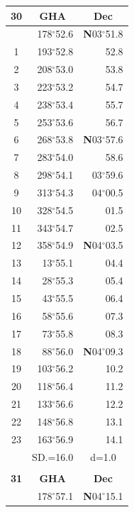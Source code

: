\documentclass[10pt, a4paper]{report}
\begin{document}
\begin{scriptsize}
\begin{tabular*}{0.2\textwidth}[t]{@{\extracolsep{\fill}}|c|rr|}
\hline
\multicolumn{1}{|c|}{\rule{0pt}{2.6ex}\textbf{30}} & \multicolumn{1}{c}{\textbf{GHA}} & \multicolumn{1}{c|}{\textbf{Dec}}\\
\hline\rule{0pt}{2.6ex}\noindent
0 & 178$^\circ$52.6 & \textbf{N}03$^\circ$51.8\\
1 & 193$^\circ$52.8 & 52.8\\
2 & 208$^\circ$53.0 & 53.8\\
3 & 223$^\circ$53.2 & \raisebox{0.24ex}{\boldmath$\cdot$~\boldmath$\cdot$~~}54.7\\
4 & 238$^\circ$53.4 & 55.7\\
5 & 253$^\circ$53.6 & 56.7\\[2Pt]
6 & 268$^\circ$53.8 & \textbf{N}03$^\circ$57.6\\
7 & 283$^\circ$54.0 & 58.6\\
8 & 298$^\circ$54.1 & 03$^\circ$59.6\\
9 & 313$^\circ$54.3 & 04$^\circ$00.5\\
10 & 328$^\circ$54.5 & 01.5\\
11 & 343$^\circ$54.7 & 02.5\\[2Pt]
12 & 358$^\circ$54.9 & \textbf{N}04$^\circ$03.5\\
13 & 13$^\circ$55.1 & 04.4\\
14 & 28$^\circ$55.3 & 05.4\\
15 & 43$^\circ$55.5 & \raisebox{0.24ex}{\boldmath$\cdot$~\boldmath$\cdot$~~}06.4\\
16 & 58$^\circ$55.6 & 07.3\\
17 & 73$^\circ$55.8 & 08.3\\[2Pt]
18 & 88$^\circ$56.0 & \textbf{N}04$^\circ$09.3\\
19 & 103$^\circ$56.2 & 10.2\\
20 & 118$^\circ$56.4 & 11.2\\
21 & 133$^\circ$56.6 & \raisebox{0.24ex}{\boldmath$\cdot$~\boldmath$\cdot$~~}12.2\\
22 & 148$^\circ$56.8 & 13.1\\
23 & 163$^\circ$56.9 & 14.1\\
\hline
\rule{0pt}{2.4ex} & \multicolumn{1}{c}{SD.=16.0} & \multicolumn{1}{c|}{d=1.0}\\
\hline
\multicolumn{1}{c}{}\\[-0.5ex]\hline
\multicolumn{1}{|c|}{\rule{0pt}{2.6ex}\textbf{31}} & \multicolumn{1}{c}{\textbf{GHA}} & \multicolumn{1}{c|}{\textbf{Dec}}\\
\hline\rule{0pt}{2.6ex}\noindent
0 & 178$^\circ$57.1 & \textbf{N}04$^\circ$15.1\\

\end{tabular*}
\end{scriptsize}
\end{document}

